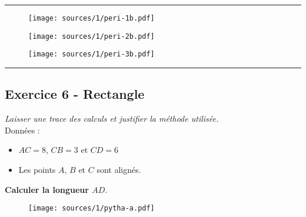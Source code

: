 \documentclass[12pt]{article}
\newcommand{\horrule}[1]{\rule{\linewidth}{#1}} %
\begin{document}
\horrule{0.5px}

\begin{multicols}{3}

  \begin{figure}[H]
    \centering
    \texttt{[image: sources/1/peri-1b.pdf]}
  \end{figure}

  \begin{figure}[H]
    \centering
    \texttt{[image: sources/1/peri-2b.pdf]}
  \end{figure}

  \begin{figure}[H]
    \centering
    \texttt{[image: sources/1/peri-3b.pdf]}
  \end{figure}

\end{multicols}


\horrule{1px}

\begin{multicols}{2}
  \subsection*{Exercice 6 - Rectangle}

  \textit{Laisser une trace des calculs et justifier la méthode utilisée.}\\

  Données : 
  \begin{itemize}
  \item $AC = 8$, $CB = 3$ et $CD = 6$
  \item Les points $A$, $B$ et $C$ sont alignés.\\
  \end{itemize}

  \textbf{Calculer la longueur $AD$}.

  \begin{figure}[H]
    \centering
    \texttt{[image: sources/1/pytha-a.pdf]}
  \end{figure}

\end{multicols}
\end{document}
